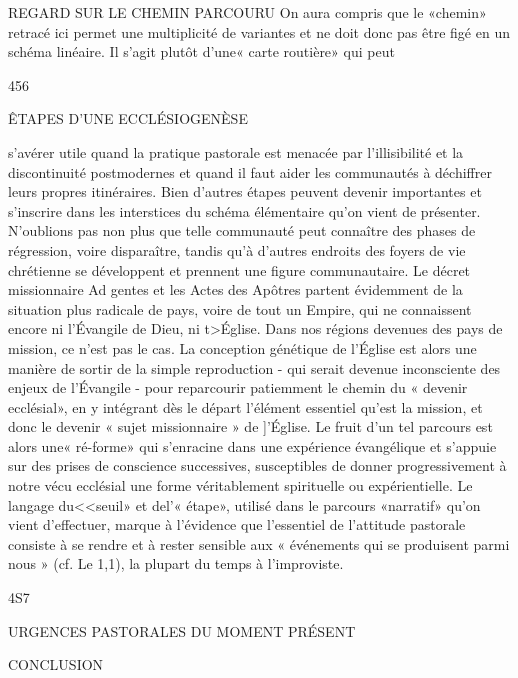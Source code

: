 {REGARD SUR LE CHEMIN PARCOURU
On aura compris que le «chemin» retracé ici permet une multiplicité de variantes et ne doit donc pas être figé en un schéma linéaire. Il s'agit plutôt d'une« carte routière» qui peut

456
 
ÊTAPES D'UNE ECCLÉSIOGENÈSE

s'avérer utile quand la pratique pastorale est menacée par l'illisibilité et la discontinuité postmodernes et quand il faut aider les communautés à déchiffrer leurs propres itinéraires. Bien d'autres étapes peuvent devenir importantes et s'inscrire dans les interstices du schéma élémentaire qu'on vient de présenter. N'oublions pas non plus que telle communauté peut connaître des phases de régression, voire disparaître, tandis qu'à d'autres endroits des foyers de vie chrétienne se développent et prennent une figure communautaire.
Le décret missionnaire Ad gentes et les Actes des Apôtres partent évidemment de la situation plus radicale de pays, voire de tout un Empire, qui ne connaissent encore ni l'Évangile de Dieu, ni t>Église. Dans nos régions devenues des pays de mission, ce n'est pas le cas. La conception génétique de l'Église est alors une manière de sortir de la simple reproduction - qui serait devenue inconsciente des enjeux de l'Évangile - pour reparcourir patiemment le chemin du « devenir ecclésial», en y intégrant dès le départ l'élément essentiel qu'est la mission, et donc le devenir « sujet missionnaire » de ]'Église. Le fruit d'un tel parcours est alors une« ré-forme» qui s'enracine dans une expérience évangélique et s'appuie sur des prises de conscience successives, susceptibles de donner progressivement à notre vécu ecclésial une forme véritablement spirituelle ou expérientielle. Le langage du<<seuil» et del'« étape», utilisé dans le parcours
«narratif» qu'on vient d'effectuer, marque à l'évidence que
l'essentiel de l'attitude pastorale consiste à se rendre et à rester sensible aux « événements qui se produisent parmi nous » (cf. Le 1,1), la plupart du temps à l'improviste.

4S7
 
URGENCES PASTORALES DU MOMENT PRÉSENT



CONCLUSION

}
